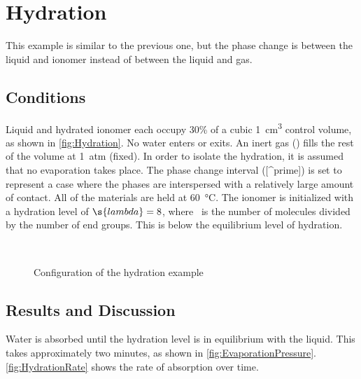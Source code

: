 \FloatBarrier %
\section{Hydration}
\label{sec:Hydration}

This example is similar to the previous one, but the phase change is between the liquid and ionomer instead of between the liquid and gas. 

\subsection{Conditions}

Liquid and hydrated ionomer each occupy 30\% of a cubic \SI{1}{cm^3} control volume, as shown in \autoref{fig:Hydration}.  No water enters or exits.  An inert gas () fills the rest of the volume at \SI{1}{atm} (fixed).  In order to isolate the hydration, it is assumed that no evaporation takes place.  The phase change interval ([^prime]) is set to represent a case where the phases are interspersed with a relatively large amount of contact.  All of the materials are held at \SI{60}{\celsius}.  The ionomer is initialized with a hydration level of $\s{lambda} = 8$, where ~is the number of  molecules divided by the number of  end groups.  This is below the equilibrium level of hydration.

\begin{figure}[htbp]
  \\
  \caption{Configuration of the hydration example}
  \label{fig:Hydration}
\end{figure}

\subsection{Results and Discussion}



Water is absorbed until the hydration level is in equilibrium with the liquid.  This takes approximately two minutes, as shown in \autoref{fig:EvaporationPressure}.  \autoref{fig:HydrationRate} shows the rate of absorption over time.  

